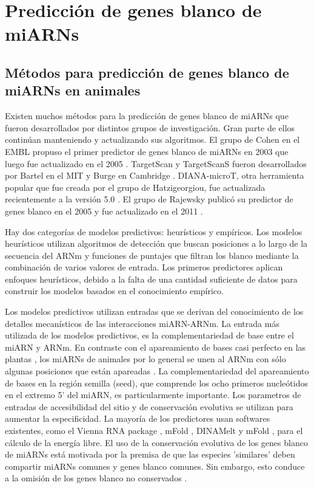 \section{Predicción de genes blanco de miARNs}

\subsection{Métodos para predicción de genes blanco de miARNs en animales}
Existen muchos métodos para la predicción de genes blanco de miARNs que fueron desarrollados por distintos grupos de investigación.
Gran parte de ellos continúan manteniendo y actualizando sus algoritmos. El grupo de Cohen en el EMBL propuso el primer predictor de genes blanco de miARNs en 2003 \citep{pmid14691535} que luego fue actualizado en el 2005 \citep{pmid16337999}.
TargetScan y TargetScanS fueron desarrollados por Bartel en el MIT y Burge en Cambridge \citep{pmid18955434,pmid17612493,pmid14697198,pmid15652477}.
DIANA-microT, otra herramienta popular que fue creada por el grupo de Hatzigeorgiou, fue actualizada recientemente a la versión 5.0 \citep{pmid19765283,pmid21551220,pmid23680784}.
El grupo de Rajewsky publicó su predictor de genes blanco en el 2005 y fue actualizado en el 2011 \citep{pmid15383676,pmid22086949}. 

Hay dos categorías de modelos predictivos: heurísticos y empíricos.
Los modelos heurísticos utilizan algoritmos de detección que buscan posiciones a lo largo de la secuencia del ARNm y funciones de puntajes que filtran los blanco mediante la combinación de varios valores de entrada.
Los primeros predictores aplican enfoques heurísticos, debido a la falta de una cantidad suficiente de datos para construir los modelos basados en el conocimiento empírico.

Los modelos predictivos utilizan entradas que se derivan del conocimiento de los detalles mecanísticos de las interacciones miARN-ARNm.
La entrada  más utilizada de los modelos predictivos, es la complementariedad de base entre el miARN y ARNm.
En contraste con el apareamiento de bases casi perfecto en las plantas \citep{Rhoades2002513}, los miARNs de animales por lo general se unen al ARNm con sólo algunas posiciones que están apareadas \citep{pmid15345038}.
La complementariedad del apareamiento de bases en la región semilla (seed), que comprende los ocho primeros nucleótidos en el extremo 5' del miARN, es particularmente importante.
Los parametros de entradas de accesibilidad del sitio y de conservación evolutiva se utilizan para aumentar la especificidad.
La mayoría de los predictores usan softwares existentes, como el Vienna RNA package \citep{pmid12824340}, mFold \citep{pmid12824337}, DINAMelt \citep{pmid15980540} y mFold \citep{pmid15215366}, para el cálculo de la energía libre.
El uso de la conservación evolutiva de los genes blanco de miARNs está motivada por la premisa de que las especies 'similares' deben compartir miARNs comunes y genes blanco comunes.
Sin embargo, esto conduce a la omisión de los genes blanco no conservados \citep{pmid17254305, pmid21674004}.


